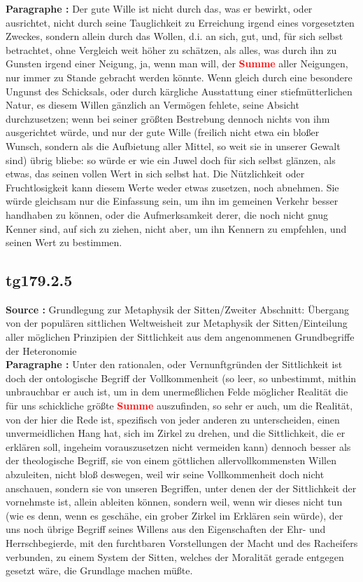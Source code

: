 \documentclass[a4paper,12pt,twoside]{book}
\newcommand{\match}[1]{\textcolor{red}{\textbf{#1}}}
\begin{document}
	\textbf{Paragraphe : }Der gute Wille ist nicht durch das, was er bewirkt, oder ausrichtet, nicht durch seine Tauglichkeit zu Erreichung irgend eines vorgesetzten Zweckes, sondern allein durch das Wollen, d.i. an sich, gut, und, für sich selbst betrachtet, ohne Vergleich weit höher zu schätzen, als alles, was durch ihn zu Gunsten irgend einer Neigung, ja, wenn man will, der \match{Summe} aller Neigungen, nur immer zu Stande gebracht werden könnte. Wenn gleich durch eine besondere Ungunst des Schicksals, oder durch kärgliche Ausstattung einer stiefmütterlichen Natur, es diesem Willen gänzlich an Vermögen fehlete, seine Absicht durchzusetzen; wenn bei seiner größten Bestrebung dennoch nichts von ihm ausgerichtet würde, und nur der gute Wille (freilich nicht etwa ein bloßer Wunsch, sondern als die Aufbietung aller Mittel, so weit sie in unserer Gewalt sind) übrig bliebe: so würde er wie ein Juwel doch für sich selbst glänzen, als etwas, das seinen vollen Wert in sich selbst hat. Die Nützlichkeit oder Fruchtlosigkeit kann diesem Werte weder etwas zusetzen, noch abnehmen. Sie würde gleichsam nur die Einfassung sein, um ihn im gemeinen Verkehr besser handhaben zu können, oder die Aufmerksamkeit derer, die noch nicht gnug Kenner sind, auf sich zu ziehen, nicht aber, um ihn Kennern zu empfehlen, und seinen Wert zu bestimmen. 
	
	\subsection*{tg179.2.5} 
	\textbf{Source : }Grundlegung zur Metaphysik der Sitten/Zweiter Abschnitt: Übergang von der populären sittlichen Weltweisheit zur Metaphysik der Sitten/Einteilung aller möglichen Prinzipien der Sittlichkeit aus dem angenommenen Grundbegriffe der Heteronomie\\  
	
	\textbf{Paragraphe : }Unter den rationalen, oder Vernunftgründen der Sittlichkeit ist doch der ontologische Begriff der Vollkommenheit (so leer, so unbestimmt, mithin unbrauchbar er auch ist, um in dem unermeßlichen Felde möglicher Realität  die für uns schickliche größte \match{Summe} auszufinden, so sehr er auch, um die Realität, von der hier die Rede ist, spezifisch von jeder anderen zu unterscheiden, einen unvermeidlichen Hang hat, sich im Zirkel zu drehen, und die Sittlichkeit, die er erklären soll, ingeheim vorauszusetzen nicht vermeiden kann) dennoch besser als der theologische Begriff, sie von einem göttlichen allervollkommensten Willen abzuleiten, nicht bloß deswegen, weil wir seine Vollkommenheit doch nicht anschauen, sondern sie von unseren Begriffen, unter denen der der Sittlichkeit der vornehmste ist, allein ableiten können, sondern weil, wenn wir dieses nicht tun (wie es denn, wenn es geschähe, ein grober Zirkel im Erklären sein würde), der uns noch übrige Begriff seines Willens aus den Eigenschaften der Ehr- und Herrschbegierde, mit den furchtbaren Vorstellungen der Macht und des Racheifers verbunden, zu einem System der Sitten, welches der Moralität gerade entgegen gesetzt wäre, die Grundlage machen müßte. 
	
\end{document}
